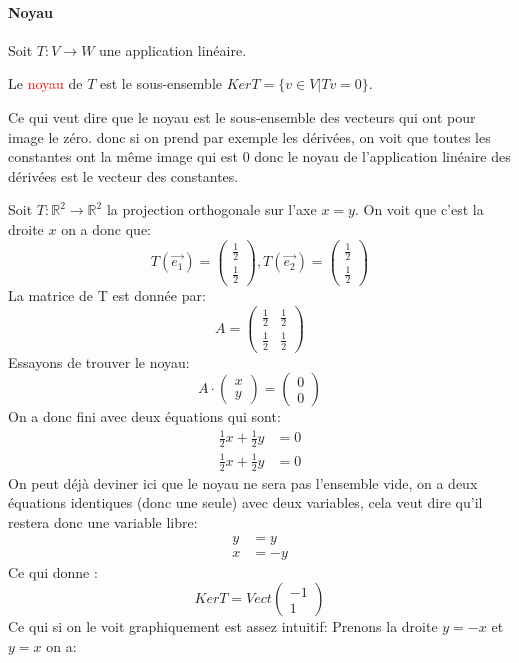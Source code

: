 \paragraph{Noyau}
Soit $T: V \to W$ une application linéaire.
\begin{definition}
    Le \textcolor{red}{noyau} de $T$ est le sous-ensemble $Ker T = \{v \in V | Tv = 0\}$.
\end{definition}
Ce qui veut dire que le noyau est le sous-ensemble des vecteurs qui ont pour image le zéro. donc si on prend par exemple les dérivées, on voit que toutes les constantes ont la même image qui est 0 donc le noyau de l'application linéaire des dérivées est le vecteur des constantes.
\begin{exemple}
    Soit $T: \mathbb{R}^2 \to \mathbb{R}^2$ la projection orthogonale sur l'axe $x = y$.
    On voit que c'est la droite $x$ on a donc que:
    \[T(\vec{e_1}) = \begin{pmatrix}
        \frac{1}{2}\\ \frac{1}{2}
    \end{pmatrix}, T(\vec{e_2}) = \begin{pmatrix}
        \frac{1}{2}\\ \frac{1}{2}
    \end{pmatrix}\]
La matrice de T est donnée par:
\[A = \begin{pmatrix}
    \frac{1}{2} & \frac{1}{2} \\
    \frac{1}{2} & \frac{1}{2}
\end{pmatrix}\]
Essayons de trouver le noyau:
\[A\cdot\begin{pmatrix}
    x \\ y
\end{pmatrix} = \begin{pmatrix}
    0 \\ 0
\end{pmatrix}\]
    On a donc fini avec deux équations qui sont:
    \begin{align*}
        \frac{1}{2}x + \frac{1}{2}y  &= 0\\
        \frac{1}{2}x + \frac{1}{2}y &= 0
    \end{align*}
    On peut déjà deviner ici que le noyau ne sera pas l'ensemble vide, on a deux équations identiques (donc une seule) avec deux variables, cela veut dire qu'il restera donc une variable libre:
    \begin{align*}
        y &= y \\
        x &= -y
    \end{align*}
    Ce qui donne : 
    \[Ker T = Vect\begin{pmatrix}
        -1 \\ 1
    \end{pmatrix}\]
    Ce qui si on le voit graphiquement est assez intuitif:
    Prenons la droite $y = -x$ et $y = x$ on a:
\begin{center}
    


\end{center}
\end{exemple}
